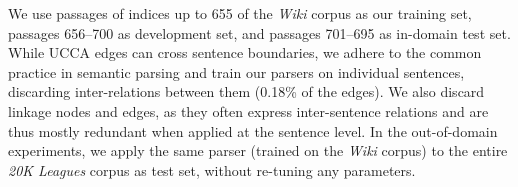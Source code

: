 \documentclass[11pt]{article}
\begin{document}
\begin{table}
\caption{\small Statistics of the \textit{Wiki} and \textit{20K Leagues} UCCA corpora.
All counts exclude the root node.
}
\label{table:data}
\end{table}

We use passages of indices up to 655
of the \textit{Wiki} corpus as our training set, passages 656--700 as development set,
and passages 701--695 as in-domain test set.
While UCCA edges can cross sentence boundaries, we adhere to the common
practice in semantic parsing and train our parsers on individual sentences,
discarding inter-relations between them (0.18\% of the edges).
We also discard linkage nodes and edges, as they often express inter-sentence
relations and are thus mostly redundant when applied at the sentence level.
In the out-of-domain experiments, we apply the same parser
(trained on the \textit{Wiki} corpus) to the entire \textit{20K Leagues}
corpus as test set, without re-tuning any parameters.
\end{document}
